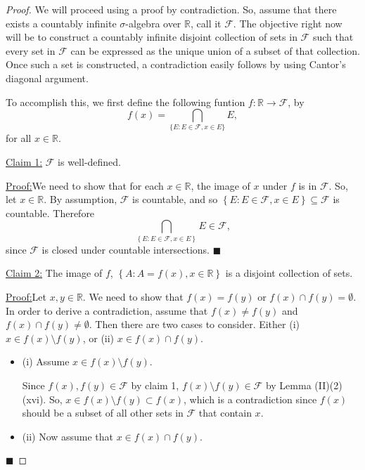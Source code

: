 \documentclass[12pt]{article}
\newenvironment{claimproof}[1]{\par\noindent\underline{Proof:}\space#1}{\hfill $\blacksquare$}
\begin{document}
\begin{proof}
We will proceed using a proof by contradiction. So, assume that there exists a countably infinite $\sigma$-algebra over $\mathbb{R}$, call it
$\mathcal{F}$. The objective right now will be to construct a countably infinite disjoint collection of sets in $\mathcal{F}$ such that every set in
$\mathcal{F}$ can be expressed as the unique union of a subset of that collection. Once such a set is constructed, a contradiction easily follows by
using Cantor's diagonal argument.

To accomplish this, we first define the following funtion $f : \mathbb{R} \rightarrow \mathcal{F}$, by 
\[ f(x) = \bigcap_{\{E : E\in \mathcal{F}, x \in E\}}E, \]
for all $x \in \mathbb{R}$.

\underline{Claim 1:} $\mathcal{F}$ is well-defined.

\begin{claimproof}
We need to show that for each $x \in \mathbb{R}$, the image of $x$ under $f$ is in $\mathcal{F}$. So, let $x \in \mathbb{R}$. By assumption, $\mathcal{F}$ is countable, and
so $\left\{ E : E \in \mathcal{F}, x \in E \right\} \subseteq \mathcal{F}$ is countable. Therefore 
\[ \bigcap_{\left\{ E: E\in\mathcal{F}, x \in E \right\}}E \in \mathcal{F}, \]
since $\mathcal{F}$ is closed under countable intersections.
\end{claimproof}

\underline{Claim 2:} The image of $f$, $\left\{ A : A = f(x), x \in \mathbb{R} \right\}$ is a disjoint collection of sets.

\begin{claimproof}
Let $x, y \in \mathbb{R}$. We need to show that $f(x) = f(y)$ or $f(x) \cap f(y) = \emptyset$. In order to derive a contradiction, assume that $f(x)
\neq f(y)$ and $f(x) \cap f(y) \neq \emptyset$. Then there are two cases to consider. Either (i) $x \in f(x) \setminus f(y)$, or (ii) $x \in f(x) \cap
f(y)$.
\begin{itemize}[label={},leftmargin=4mm, itemsep=1em, parsep=1em]
\item (i) Assume $x \in f(x) \setminus f(y)$.

Since $f(x), f(y) \in \mathcal{F}$ by claim 1, $f(x) \setminus f(y) \in \mathcal{F}$ by Lemma (II)(2)(xvi). So, $x \in f(x) \setminus f(y) \subset
f(x)$, which is a contradiction since $f(x)$ should be a subset of all other sets in $\mathcal{F}$ that contain $x$.

\item (ii) Now assume that $x \in f(x) \cap f(y)$.


\end{itemize}
\end{claimproof}
\end{proof}
\end{document}
